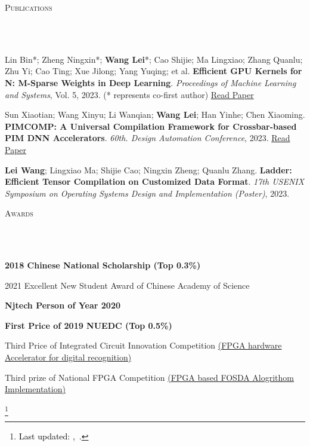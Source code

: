 \documentclass{article}
\newcommand\blfootnote[1]{%
  \begingroup
  \renewcommand\thefootnote{}\footnote{#1}%
  \addtocounter{footnote}{-1}%
  \endgroup
}
\newcommand{\header}[1]{{
\hspace*{-15pt}\vspace*{6pt} \textsc{#1}} \vspace*{-6pt} 
\lineunder
}
\newcommand{\lineunder}{
\vspace*{-8pt} \\ \hspace*{-18pt} 
\hrulefill \\
}
\renewcommand{\labelitemii}{
$\vcenter{\hbox{\tiny$\bullet$}}$\hspace*{-3pt}
}
\newcommand{\myhref}[2]{%
\href{#1}{\textcolor{ColorTwo}{#2}}
}
\newenvironment{bullet-list-major}{
\begin{list}{\labelitemii}{\setlength\leftmargin{3pt} 
\topsep 0pt \itemsep -2pt}}{\vspace*{4pt}\end{list}
}
\begin{document}
\vspace*{4pt}%
\header{Publications}
    \begin{bullet-list-major}
    \item Lin Bin*; Zheng Ningxin*; \textbf{Wang Lei}*; Cao Shijie; Ma Lingxiao; Zhang Quanlu; Zhu Yi; Cao Ting; Xue Jilong; Yang Yuqing; et al. \textbf{Efficient GPU Kernels for N: M-Sparse Weights in Deep Learning}. \textit{Proceedings of Machine Learning and Systems}, Vol. 5, 2023. (* represents co-first author) \hspace{2pt} \textcolor{ColorTwo}{\faLink}  \myhref{https://proceedings.mlsys.org/paper_files/paper/2023/file/4552cedd396a308320209f75f56a5ad5-Paper-mlsys2023.pdf}{Read Paper}
    \vspace{2pt}
    \item Sun Xiaotian; Wang Xinyu; Li Wanqian; \textbf{Wang Lei}; Han Yinhe; Chen Xiaoming. \textbf{PIMCOMP: A Universal Compilation Framework for Crossbar-based PIM DNN Accelerators}. \textit{60th. Design Automation Conference}, 2023.    \textcolor{ColorTwo}{\faLink}  \myhref{https://arxiv.org/pdf/2307.01475.pdf}{Read Paper}
    \vspace{2pt}
    \item \textbf{Lei Wang}; Lingxiao Ma; Shijie Cao; Ningxin Zheng; Quanlu Zhang. \textbf{Ladder: Efficient Tensor Compilation on Customized Data Format}. \textit{17th USENIX Symposium on Operating Systems Design and Implementation (Poster)}, 2023.

    \end{bullet-list-major}

\vspace*{4pt}%
\header{Awards}
\begin{bullet-list-major}
    \item \textbf{2018 Chinese National Scholarship (Top 0.3\%)}
    \vspace{2pt}
    \item 2021 Excellent New Student Award of Chinese Academy of Science
    \vspace{2pt}
    \item \textbf{Njtech \textbf{Person of Year 2020}}
    \vspace{2pt}
    \item \textbf{First Price of 2019 NUEDC (Top 0.5\%)}
    \vspace{2pt}
    \item Third Price of Integrated Circuit Innovation Competition \href{http://leiblog.wang/FPGA车牌识别/}{(FPGA hardware Accelerator for digital recognition)}
    \vspace{2pt}
    \item Third prize of National FPGA Competition \href{http://leiblog.wang/ZYNQ声源定位波束形成/}{(FPGA based FOSDA Alogrithom Implementation)}
\end{bullet-list-major}

\blfootnote{
\textcolor{black}{Last updated: \monthname,~\the\year.} \vspace{1mm}
}
\end{document}
